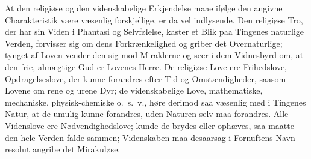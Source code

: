 \documentclass[12pt,a4paper]{article}
\newcommand{\opage}[1]{\marginnote{\footnotesize\textit{[#1]}}}
\begin{document}
At den religiøse og den videnskabelige Erkjendelse maae ifølge den
angivne Charakteristik være væsenlig forskjellige, er da vel indlysende.
Den religiøse Tro, der har sin Viden i Phantasi og Selvfølelse, kaster
et Blik paa Tingenes naturlige Verden, forvisser sig om dens
Forkrænkelighed og griber det Overnaturlige; tynget af Loven vender
den sig mod Miraklerne og seer i dem Vidnesbyrd om, at den frie,
almægtige Gud er Lovenes Herre. De religiøse Love ere Frihedslove,
Opdragelseslove, der kunne forandres efter Tid og Omstændigheder,
saasom Lovene om rene og urene Dyr; de videnskabelige Love,
mathematiske, mechaniske, physisk-chemiske o.\ s.\ v., høre derimod
saa væsenlig med i Tingenes Natur, at de umulig kunne forandres, uden
Naturen selv maa forandres. Alle Videnslove ere Nødvendighedslove;
kunde de brydes eller ophæves, saa \opage{7} maatte den hele Verden falde sammen;
Videnskaben maa desaarsag i Fornuftens Navn resolut angribe det
Mirakuløse.
\end{document}
